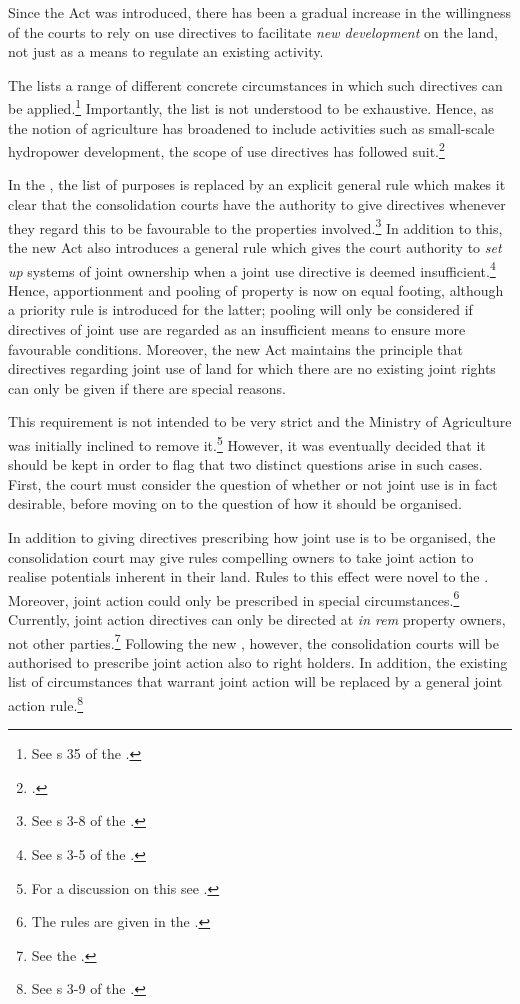 Since the Act was introduced, there has been a gradual increase in the willingness of the courts to rely on use directives to facilitate \emph{new development} on the land, not just as a means to regulate an existing activity.

The \cite{lca79} lists a range of different concrete circumstances in which such directives can be applied.\footnote{See s 35 of the \cite{lca79}.} Importantly, the list is not understood to be exhaustive. Hence, as the notion of agriculture has broadened to include activities such as small-scale hydropower development, the scope of use directives has followed suit.\footcite[103]{otprp57}

In the \cite{lca13}, the list of purposes is replaced by an explicit general rule which makes it clear that the consolidation courts have the authority to give directives whenever they regard this to be favourable to the properties involved.\footnote{See s 3-8 of the \cite{lca13}.} In addition to this, the new Act also introduces a general rule which gives the court authority to \emph{set up} systems of joint ownership when a joint use directive is deemed insufficient.\footnote{See s 3-5 of the \cite{lca13}.} Hence, apportionment and pooling of property is now on equal footing, although a priority rule is introduced for the latter; pooling will only be considered if directives of joint use are regarded as an insufficient means to ensure more favourable conditions. Moreover, the new Act maintains the principle that directives regarding joint use of land for which there are no existing joint rights can only be given if there are special reasons.

This requirement is not intended to be very strict and the Ministry of Agriculture was initially inclined to remove it.\footnote{For a discussion on this see \cite[140-141]{prop12}.} However, it was eventually decided that it should be kept in order to flag that two distinct questions arise in such cases. First, the court must consider the question of whether or not joint use is in fact desirable, before moving on to the question of how it should be organised.

In addition to giving directives prescribing how joint use is to be organised, the consolidation court may give rules compelling owners to take joint action to realise potentials inherent in their land. Rules to this effect were novel to the \cite{lca79}. Moreover, joint action could only be prescribed in special circumstances.\footnote{The rules are given in the \cite[2 e)|42-44]{lca79}.} Currently, joint action directives can only be directed at {\it in rem} property owners, not other parties.\footnote{See the \cite[34 a)]{lca79}.} Following the new \cite{lca13}, however, the consolidation courts will be authorised to prescribe joint action also to right holders. In addition, the existing list of circumstances that warrant joint action will be replaced by a general joint action rule.\footnote{See s 3-9 of the \cite{lca13}.}

